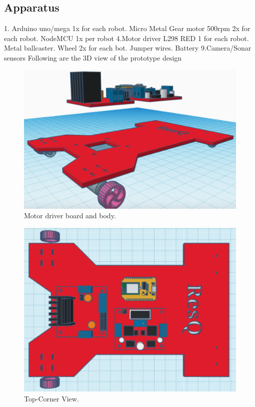 \documentclass{Resources/UoBLab1}
\begin{document}
\subsection{Apparatus}
1. Arduino uno/mega 1x for each robot. Micro Metal Gear motor 500rpm 2x for each robot. NodeMCU 1x per robot\newline
4.Motor driver L298 RED 1 for each robot. Metal ballcaster. Wheel 2x for each bot. Jumper wires. Battery\newline
9.Camera/Sonar sensors\newline\newline
Following are the 3D view of the prototype design\newline
\begin{figure}
    \centering
    \includegraphics[width=\linewidth]{Resources/comp}
    \caption{Motor driver board and body.\cite{reference1}}
    \label{fig:my_label}
\end{figure}
\begin{figure}
    \centering
    \includegraphics[width=\linewidth]{Resources/top}
    \caption{Top-Corner View.\cite{reference1}}
    \label{fig:my_label}
\end{figure}
\end{document}
